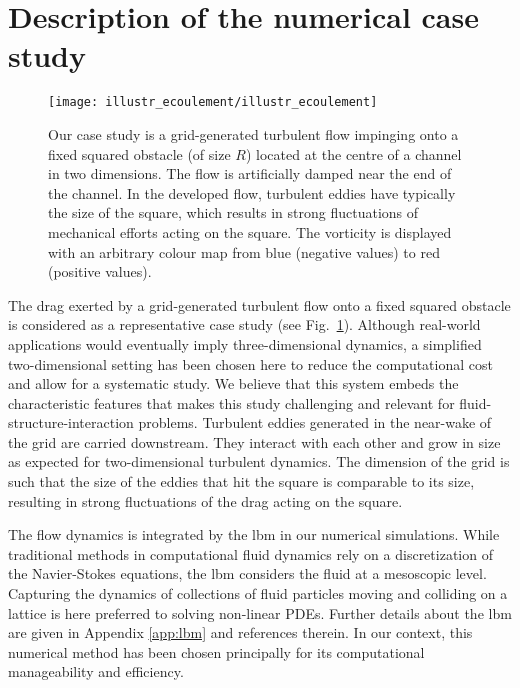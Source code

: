\section{Description of the numerical case study}
\label{sec:test_flow}

\begin{figure}
	\centering
	\texttt{[image: illustr\_ecoulement/illustr\_ecoulement]}
	\caption{Our case study is a grid-generated turbulent flow impinging onto a fixed squared obstacle (of size $R$) located at the centre of a channel in two dimensions. The flow is artificially damped near the end of the channel. In the developed flow, turbulent eddies have typically the size of the square, which results in strong fluctuations of mechanical efforts acting on the square. The vorticity is displayed with an arbitrary colour map from blue (negative values) to red (positive values).}
	\label{fig:illustr_ecoulement}
\end{figure}

%
The drag exerted by a grid-generated turbulent flow onto a fixed squared obstacle is considered as a representative case study (see Fig.~\ref{fig:illustr_ecoulement}).
%
Although real-world applications would eventually imply three-dimensional dynamics, a simplified two-dimensional setting has been chosen here to reduce the computational cost and allow for a systematic study.
%
We believe that this system embeds the characteristic features that makes this study challenging and relevant for fluid-structure-interaction problems.
Turbulent eddies generated in the near-wake of the grid are carried downstream.
They interact with each other and grow in size as expected for two-dimensional turbulent dynamics.
The dimension of the grid is such that the size of the eddies that hit the square is comparable to its size, resulting in strong fluctuations of the drag acting on the square.
%
%
%

%
The flow dynamics is integrated by the \ac{lbm} in our numerical simulations.
While traditional methods in computational fluid dynamics rely on a discretization of the Navier-Stokes equations, the \ac{lbm} considers the fluid at a mesoscopic level.
Capturing the dynamics of collections of fluid particles moving and colliding on a lattice is here preferred to solving non-linear PDEs.
Further details about the \ac{lbm} are given in Appendix \ref{app:lbm} and references therein.
In our context, this numerical method has been chosen principally for its computational manageability and efficiency.


